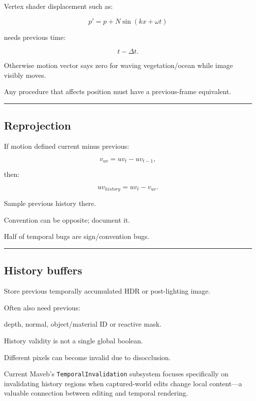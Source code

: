 Vertex shader displacement such as:

\[
p'=p+
N\sin(
kx+\omega t
)
\]

needs previous time:

\[
t-\Delta t.
\]

Otherwise motion vector says zero for waving vegetation/ocean while image visibly moves.

Any procedure that affects position must have a previous-frame equivalent.

\begin{center}\rule{0.5\linewidth}{0.5pt}\end{center}

\subsection{Reprojection}\label{04-visual-computing-ii-ch040-reprojection}

If motion defined current minus previous:

\[
v_{uv}
=
uv_t-uv_{t-1},
\]

then:

\[
\boxed{
uv_{history}
=
uv_t-v_{uv}.
}
\]

Sample previous history there.

Convention can be opposite; document it.

Half of temporal bugs are sign/convention bugs.

\begin{center}\rule{0.5\linewidth}{0.5pt}\end{center}

\subsection{History buffers}\label{04-visual-computing-ii-ch040-history-buffers}

Store previous temporally accumulated HDR or post-lighting image.

Often also need previous:

depth, normal, object/material ID or reactive mask.

History validity is not a single global boolean.

Different pixels can become invalid due to disocclusion.

Current Maveb's \texttt{TemporalInvalidation} subsystem focuses specifically on invalidating history regions when captured-world edits change local content---a valuable connection between editing and temporal rendering.

